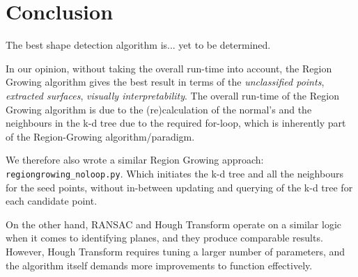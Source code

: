 \documentclass[a4paper,9pt]{article}
\begin{document}
\section{Conclusion}
\par
The best shape detection algorithm is... yet to be determined.
\\\par
\par
In our opinion, without taking the overall run-time into account, the Region Growing algorithm gives the best result in terms of the \textit{unclassified points}, \textit{extracted surfaces}, \textit{visually interpretability}. The overall run-time of the Region Growing algorithm is due to the (re)calculation of the normal's and the neighbours in the k-d tree due to the required for-loop, which is inherently part of the Region-Growing algorithm/paradigm.
\\\par
\par
We therefore also wrote a similar Region Growing approach: \verb|regiongrowing_noloop.py|. Which initiates the k-d tree and all the neighbours for the seed points, without in-between updating and querying of the k-d tree for each candidate point. 
\\\par
\par
On the other hand, RANSAC and Hough Transform operate on a similar logic when it comes to identifying planes, and they produce comparable results. However, Hough Transform requires tuning a larger number of parameters, and the algorithm itself demands more improvements to function effectively.
\\\par
\end{document}
